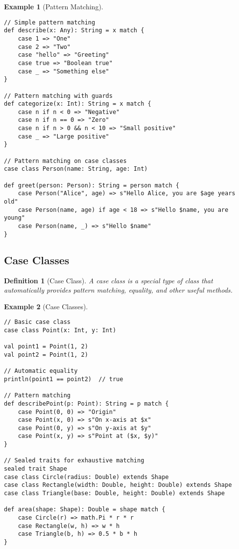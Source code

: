\documentclass[11pt]{article}
\newtheorem{definition}{Definition}[section]
\newtheorem{example}{Example}[section]
\begin{document}
\begin{example}[Pattern Matching]
\begin{lstlisting}
// Simple pattern matching
def describe(x: Any): String = x match {
    case 1 => "One"
    case 2 => "Two"
    case "hello" => "Greeting"
    case true => "Boolean true"
    case _ => "Something else"
}

// Pattern matching with guards
def categorize(x: Int): String = x match {
    case n if n < 0 => "Negative"
    case n if n == 0 => "Zero"
    case n if n > 0 && n < 10 => "Small positive"
    case _ => "Large positive"
}

// Pattern matching on case classes
case class Person(name: String, age: Int)

def greet(person: Person): String = person match {
    case Person("Alice", age) => s"Hello Alice, you are $age years old"
    case Person(name, age) if age < 18 => s"Hello $name, you are young"
    case Person(name, _) => s"Hello $name"
}
\end{lstlisting}
\end{example}

\subsection{Case Classes}

\begin{definition}[Case Class]
A case class is a special type of class that automatically provides pattern matching, equality, and other useful methods.
\end{definition}

\begin{example}[Case Classes]
\begin{lstlisting}
// Basic case class
case class Point(x: Int, y: Int)

val point1 = Point(1, 2)
val point2 = Point(1, 2)

// Automatic equality
println(point1 == point2)  // true

// Pattern matching
def describePoint(p: Point): String = p match {
    case Point(0, 0) => "Origin"
    case Point(x, 0) => s"On x-axis at $x"
    case Point(0, y) => s"On y-axis at $y"
    case Point(x, y) => s"Point at ($x, $y)"
}

// Sealed traits for exhaustive matching
sealed trait Shape
case class Circle(radius: Double) extends Shape
case class Rectangle(width: Double, height: Double) extends Shape
case class Triangle(base: Double, height: Double) extends Shape

def area(shape: Shape): Double = shape match {
    case Circle(r) => math.Pi * r * r
    case Rectangle(w, h) => w * h
    case Triangle(b, h) => 0.5 * b * h
}
\end{lstlisting}
\end{example}
\end{document}
